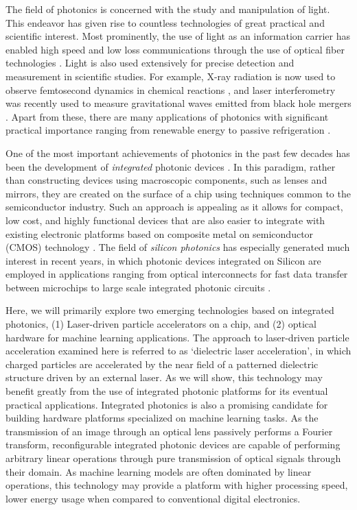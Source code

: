 
The field of photonics is concerned with the study and manipulation of light.
This endeavor has given rise to countless technologies of great practical and scientific interest.
Most prominently, the use of light as an information carrier has enabled high speed and low loss communications through the use of optical fiber technologies \cite{agrawal_fiber-optic_2012}.
Light is also used extensively for precise detection and measurement in  scientific studies.  
For example, X-ray radiation is now used to observe femtosecond dynamics in chemical reactions \cite{kern_structures_2018}, and laser interferometry was recently used to measure gravitational waves emitted from black hole mergers \cite{ligo_scientific_collaboration_and_virgo_collaboration_observation_2016}.
Apart from these, there are many applications of photonics with significant practical importance ranging from renewable energy \cite{carlson_amorphous_1976,yu_fundamental_2010} to passive refrigeration \cite{raman_passive_2014,hsu_radiative_2016}.

One of the most important achievements of photonics in the past few decades has been the development of \textit{integrated} photonic devices \cite{pollock_integrated_2010}.
In this paradigm, rather than constructing devices using macroscopic components, such as lenses and mirrors, they are created on the surface of a chip using techniques common to the semiconductor industry.
Such an approach is appealing as it allows for compact, low cost, and highly functional devices that are also easier to integrate with existing electronic platforms based on composite metal on semiconductor (CMOS) technology \cite{weste_principles_1985}.
The field of \textit{silicon photonics} has especially generated much interest in recent years, in which photonic devices integrated on Silicon are employed in applications ranging from optical interconnects for fast data transfer between microchips to large scale integrated photonic circuits \cite{jalali_silicon_2006}.

Here, we will primarily explore two emerging technologies based on integrated photonics, (1) Laser-driven particle accelerators on a chip, and (2) optical hardware for machine learning applications.
The approach to laser-driven particle acceleration examined here is referred to as `dielectric laser acceleration', in which charged particles are accelerated by the near field of a patterned dielectric structure driven by an external laser.
As we will show, this technology may benefit greatly from the use of integrated photonic platforms for its eventual practical applications.
Integrated photonics is also a promising candidate for building hardware platforms specialized on machine learning tasks.
As the transmission of an image through an optical lens passively performs a Fourier transform, reconfigurable integrated photonic devices are capable of performing arbitrary linear operations through pure transmission of optical signals through their domain.
As machine learning models are often dominated by linear operations, this technology may provide a platform with higher processing speed, lower energy usage when compared to conventional digital electronics.

